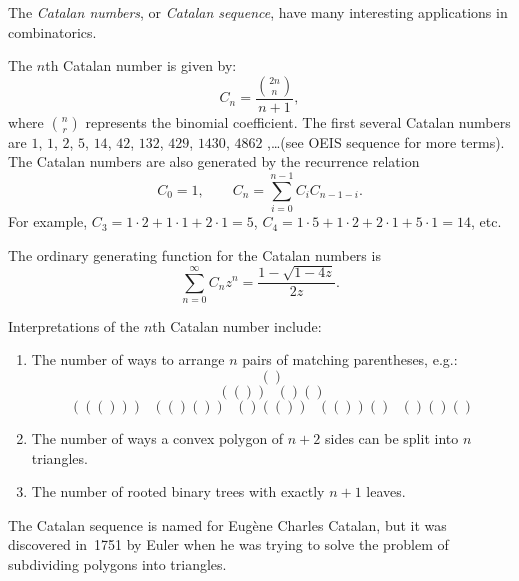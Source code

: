 \documentclass[12pt]{article}
\begin{document}

The \emph{Catalan numbers}, or \emph{Catalan sequence}, have many interesting applications in combinatorics.

The $n$th Catalan number is given by:
$$C_n = \frac{\binom{2n}{n}}{n+1},$$
where $\binom{n}{r}$ represents the binomial coefficient. The first several Catalan numbers are $1$, $1$, $2$, $5$, $14$, $42$, $132$, $429$, $1430$, $4862$  ,\dots (see OEIS sequence  for more terms). The Catalan numbers are also generated by the recurrence relation
\begin{equation*}
C_0=1,\qquad C_n=\sum_{i=0}^{n-1} C_i C_{n-1-i}.
\end{equation*}
For example, $C_3=1\cdot 2+ 1\cdot 1+2\cdot 1=5$, $C_4 = 1\cdot 5 + 1\cdot 2 + 2\cdot 1 + 5\cdot 1 = 14$, etc.

The ordinary generating function for the Catalan numbers is
\begin{equation*}
\sum_{n=0}^\infty C_n z^n=\frac{1-\sqrt{1-4z}}{2z}.
\end{equation*}

Interpretations of the $n$th Catalan number include:
\begin{enumerate}
\item The number of ways to arrange $n$ pairs of matching parentheses, e.g.:
$$()$$
$$(())\text{ } ()()$$
$$((()))\text{ } (()())\text{ } ()(())\text{ } (())()\text{ } ()()()$$
\item The number of ways a convex polygon of $n+2$ sides can be split into $n$ triangles.
\item The number of rooted binary trees with exactly $n+1$ leaves.
\end{enumerate}


The Catalan sequence is named for Eug\`ene Charles Catalan, but it was discovered in~1751 by Euler when he was trying to solve the problem of subdividing polygons into triangles.
\end{document}
